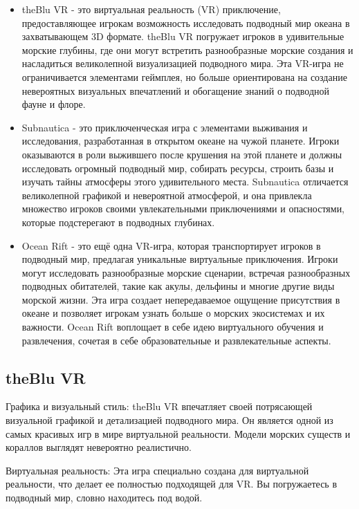 \documentclass{../mirea-prog-lang}
\begin{document}
\begin{itemize}
	\item theBlu VR - это виртуальная реальность (VR) приключение, предоставляющее игрокам возможность исследовать подводный мир океана в захватывающем 3D формате. theBlu VR погружает игроков в удивительные морские глубины, где они могут встретить разнообразные морские создания и насладиться великолепной визуализацией подводного мира. Эта VR-игра не ограничивается элементами геймплея, но больше ориентирована на создание невероятных визуальных впечатлений и обогащение знаний о подводной фауне и флоре.
	
	\item Subnautica - это приключенческая игра с элементами выживания и исследования, разработанная в открытом океане на чужой планете. Игроки оказываются в роли выжившего после крушения на этой планете и должны исследовать огромный подводный мир, собирать ресурсы, строить базы и изучать тайны атмосферы этого удивительного места. Subnautica отличается великолепной графикой и невероятной атмосферой, и она привлекла множество игроков своими увлекательными приключениями и опасностями, которые подстерегают в подводных глубинах.
	
	\item Ocean Rift - это ещё одна VR-игра, которая транспортирует игроков в подводный мир, предлагая уникальные виртуальные приключения. Игроки могут исследовать разнообразные морские сценарии, встречая разнообразных подводных обитателей, такие как акулы, дельфины и многие другие виды морской жизни. Эта игра создает непередаваемое ощущение присутствия в океане и позволяет игрокам узнать больше о морских экосистемах и их важности. Ocean Rift воплощает в себе идею виртуального обучения и развлечения, сочетая в себе образовательные и развлекательные аспекты.
\end{itemize}

\subsection{theBlu VR}

Графика и визуальный стиль:
theBlu VR впечатляет своей потрясающей визуальной графикой и детализацией подводного мира. Он является одной из самых красивых игр в мире виртуальной реальности. Модели морских существ и кораллов выглядят невероятно реалистично.

Виртуальная реальность:
Эта игра специально создана для виртуальной реальности, что делает ее полностью подходящей для VR. Вы погружаетесь в подводный мир, словно находитесь под водой.
\end{document}
